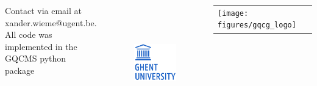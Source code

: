 \documentclass[25pt, a0paper, portrait]{tikzposter}
\begin{document}
\begin{columns}
     {
        Contact via email at xander.wieme@ugent.be. \\
        All code was implemented in the GQCMS python package\cite{GQCMS} \\
        \begin{figure}
            \vspace{-4cm}
            \begin{tikzfigure}[]
                \includegraphics[height=5cm]{figures/ugent_logo}
            \end{tikzfigure}
        \end{figure}
        \begin{tabular}{l@{\hskip 1cm}c}
            \hspace{-1cm} \texttt{[image: figures/gqcg\_logo]}
        \end{tabular}
    }


\end{columns}
\end{document}
